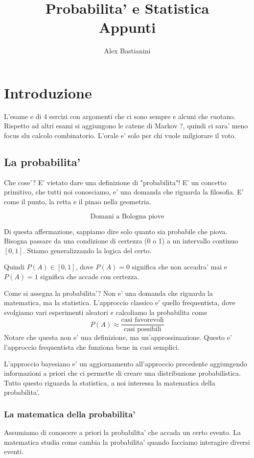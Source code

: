 \documentclass{report}
\title{\Huge{Probabilita' e Statistica}\\Appunti}
\author{\huge{Alex Bastianini}}
\date{}
\begin{document}
\maketitle
\newpage%
\tableofcontents

\pagebreak

\chapter{Introduzione}
L'esame e di 4 esrcizi con argomenti che ci sono sempre e alcuni che ruotano. Rispetto ad altri esami si aggiungono le catene di Markov ?, quindi ci sara' meno focus slu calcolo combinatorio. L'orale e' solo per chi vuole milgiorare il voto.

\section{La probabilita'}
Che cose'? E' vietato dare una definizione di "probabilita"! E' un concetto primitivo, che tutti noi conosciamo, e' una domanda che riguarda la filosofia. E' come il punto, la retta e il pinao nella geometria.

\[
\text{Domani a Bologna piove}
\]

Di questa affermazione, sappiamo dire solo quanto sia probabile che piova. Bisogna passare da una condizione di certezza (0 o 1) a un intervallo continuo $ [0,1] $. Stiamo generalizzando la logica del certo. 

Quindi $ P(A) \in [0,1] $, dove $ P(A) = 0 $ significa che non accadra' mai e $ P(A) = 1 $ significa che accade con certezza.

Come si assegna la probabilita'? Non e' una domanda che riguarda la matematica, ma la statistica. L'approccio classico e' quello frequentista, dove svolgiamo vari esperimenti aleatori e calcoliamo la probabilita come 
\[
  P(A) \approx \frac{\text{casi favorevoli}}{\text{casi possibili}}
\]
Notare che questa non e' una definizione, ma un'approssimazione. Questo e' l'approccio frequentista che funziona bene in casi semplici.

L'approccio bayesiano e' un aggiornamento all'approccio precedente aggiungendo informazioni a priori che ci permette di creare una distribuzione probabilistica. Tutto questo riguarda la statistica, a noi interessa la matematica della probabilita'.

\subsection{La matematica della probabilita'}
Assumiamo di conoscere a priori la probabilita' che accada un certo evento. La matematica studia come cambia la probabilita' quando facciamo interagire diversi eventi.
\end{document}
